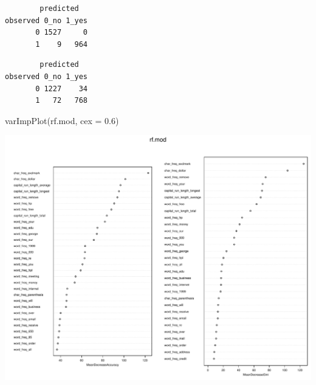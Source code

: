 \documentclass[
  11pt,
]{article}
\newenvironment{Shaded}{\begin{snugshade}}{\end{snugshade}}
\newcommand{\AttributeTok}[1]{\textcolor[rgb]{0.77,0.63,0.00}{#1}}
\newcommand{\FloatTok}[1]{\textcolor[rgb]{0.00,0.00,0.81}{#1}}
\newcommand{\FunctionTok}[1]{\textcolor[rgb]{0.00,0.00,0.00}{#1}}
\newcommand{\NormalTok}[1]{#1}
\newcommand{\OtherTok}[1]{\textcolor[rgb]{0.56,0.35,0.01}{#1}}
\newcommand{\SpecialCharTok}[1]{\textcolor[rgb]{0.00,0.00,0.00}{#1}}
\begin{document}
\begin{Shaded}
\end{Shaded}

\begin{verbatim}
        predicted
observed 0_no 1_yes
       0 1527     0
       1    9   964
\end{verbatim}

\begin{Shaded}
\end{Shaded}

\begin{verbatim}
        predicted
observed 0_no 1_yes
       0 1227    34
       1   72   768
\end{verbatim}

\begin{Shaded}
\begin{Highlighting}[]
\FunctionTok{varImpPlot}\NormalTok{(rf.mod, }\AttributeTok{cex =} \FloatTok{0.6}\NormalTok{) }
\end{Highlighting}
\end{Shaded}

\includegraphics{report_files/figure-latex/Task_2_22-1.pdf}
\end{document}
